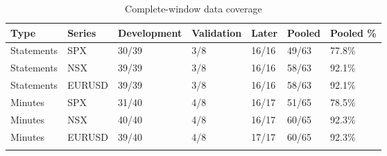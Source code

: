 \begin{table}[htbp]
\centering
{\fontsize{9.6}{12}\selectfont\renewcommand{\arraystretch}{1.22}\setlength{\tabcolsep}{4pt}
\begin{tabularx}{\linewidth}{@{}L{23mm}L{15mm}C{26mm}C{20mm}C{17mm}C{17mm}X@{}}
\toprule{}
\textbf{Type} & \textbf{Series} & \textbf{Development} & \textbf{Validation} & \textbf{Later} & \textbf{Pooled} & \textbf{Pooled \%} \\ \midrule
Statements & SPX & 30/39 & 3/8 & 16/16 & 49/63 & 77.8\% \\ \hline
Statements & NSX & 39/39 & 3/8 & 16/16 & 58/63 & 92.1\% \\ \hline
Statements & EURUSD & 39/39 & 3/8 & 16/16 & 58/63 & 92.1\% \\ \hline
Minutes & SPX & 31/40 & 4/8 & 16/17 & 51/65 & 78.5\% \\ \hline
Minutes & NSX & 40/40 & 4/8 & 16/17 & 60/65 & 92.3\% \\ \hline
Minutes & EURUSD & 39/40 & 4/8 & 17/17 & 60/65 & 92.3\% \\ \hline
{}\bottomrule\end{tabularx}}
\caption[Complete-window data coverage]{Complete-window data coverage}\label{tab:coverage}
\end{table}
